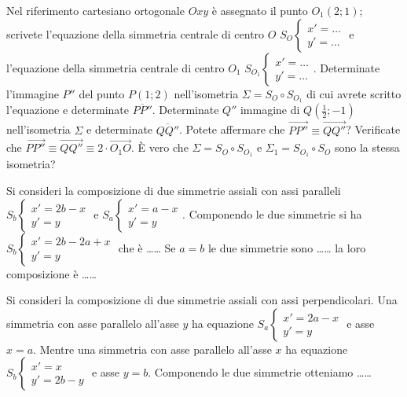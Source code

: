 \begin{esercizio}
	\label{ese:8.78} %
	Nel riferimento cartesiano ortogonale \(Oxy\) è assegnato il punto 
	\(O_1(2;1)\); scrivete l'equazione della simmetria centrale di centro 
	\(O\) \(S_O\begin{cases}x'=\ldots{}\\y'=\ldots{}\end{cases}\)  e 
	l'equazione della simmetria centrale di centro \(O_1\) 
	\(S_{O_1}\begin{cases}x'=\ldots{}\\y'=\ldots{}\end{cases}\). 
	Determinate l'immagine \(P''\) del punto \(P(1;2)\) nell'isometria 
	\(\Sigma=S_O \circ S_{O_1}\) di cui avrete scritto l'equazione e 
	determinate \(\overline{PP''}\). Determinate \(Q''\) immagine di 
	\(Q\left(\frac{1}{2};-1\right)\) nell'isometria \(\Sigma\) e determinate 
	\(\overline{QQ''}\). Potete affermare che \(\overrightarrow{PP''} \equiv 
	\overrightarrow{QQ''}\)? Verificate che \(\overrightarrow{PP''} \equiv 
	\overrightarrow{QQ''} \equiv 2\cdot \overrightarrow{O_1O}\).
	\`E vero che \(\Sigma=S_O \circ S_{O_1}\) e \(\Sigma_1=S_{O_1} \circ 
	S_{O}\) sono la stessa isometria?
\end{esercizio}

\begin{esercizio}
	\label{ese:8.80} %
	Si consideri la composizione di due simmetrie assiali con assi 
	paralleli \(S_b\begin{cases}x'=2b-x\\y'=y\end{cases}\) e 
	\(S_a\begin{cases}x'=a-x\\y'=y\end{cases}\).
	Componendo le due simmetrie si ha 
	\(S_b\begin{cases}x'=2b-2a+x\\y'=y\end{cases}\) che è \ldots\ldots{}
	Se \(a=b\) le due simmetrie sono \ldots\ldots{} la loro composizione è 
	\ldots\dots{}
\end{esercizio}

\begin{esercizio}
	\label{ese:8.81} %
	Si consideri la composizione di due simmetrie assiali con assi 
	perpendicolari.
	Una simmetria con asse parallelo all'asse \(y\) ha equazione 
	\(S_a\begin{cases}x'=2a-x\\y'=y\end{cases}\) e asse \(x = a\).
	Mentre una simmetria con asse parallelo all'asse \(x\) ha equazione 
	\(S_b\begin{cases}x'=x\\y'=2b-y\end{cases}\) e asse \(y = b\).
	Componendo le due simmetrie otteniamo \ldots\ldots{}
\end{esercizio}

